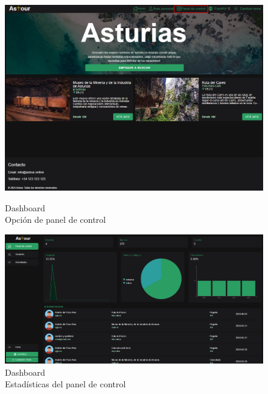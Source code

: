 \begin{figure}[H]
	\centering
	\begin{minipage}{0.45\textwidth}
		\centering
		\includegraphics[width=1\textwidth]{7-Construccion/Manuales/web/panel control opcion.png}
		\caption{Dashboard \\ Opción de panel de control}
		\label{fig:panel-control-opcion}
	\end{minipage}
	\hfill
	\begin{minipage}{0.45\textwidth}
		\centering
		\includegraphics[width=1\textwidth]{7-Construccion/Manuales/web/panel control.png}
		\caption{Dashboard \\ Estadísticas del panel de control}
		\label{fig:panel-control}
	\end{minipage}
\end{figure}

